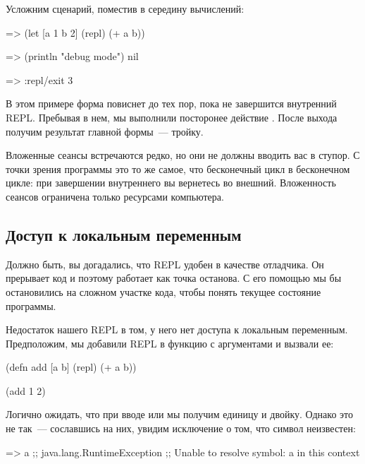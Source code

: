 Усложним сценарий, поместив  в середину вычислений:

\begin{english}
  \begin{clojure/lines}
=> (let [a 1 b 2] (repl) (+ a b))

=> (println "debug mode")
nil

=> :repl/exit
3
  \end{clojure/lines}
\end{english}

В этом примере форма  повиснет до тех пор, пока не завершится внутренний REPL. Пребывая в нем, мы выполнили посторонее действие . После выхода получим результат главной формы~--- тройку.

Вложенные сеансы встречаются редко, но они не должны вводить вас в ступор. С точки зрения программы это то же самое, что бесконечный цикл в бесконечном цикле: при завершении внутреннего вы вернетесь во внешний. Вложенность сеансов ограничена только ресурсами компьютера.

\subsection{Доступ к локальным переменным}


Должно быть, вы догадались, что REPL удобен в качестве отладчика. Он прерывает код и поэтому работает как точка останова. С его помощью мы бы остановились на сложном участке кода, чтобы понять текущее состояние программы.

Недостаток нашего REPL в том, у него нет доступа к локальным переменным. Предположим, мы добавили REPL в функцию с аргументами и вызвали ее:

\begin{english}
  \begin{clojure}
(defn add [a b]
  (repl)
  (+ a b))

(add 1 2)
  \end{clojure}
\end{english}

Логично ожидать, что при вводе  или  мы получим единицу и двойку. Однако это не так~--- сославшись на них, увидим исключение о том, что символ неизвестен:

\begin{english}
  \begin{clojure}
=> a
;; java.lang.RuntimeException
;; Unable to resolve symbol: a in this context
  \end{clojure}
\end{english}

